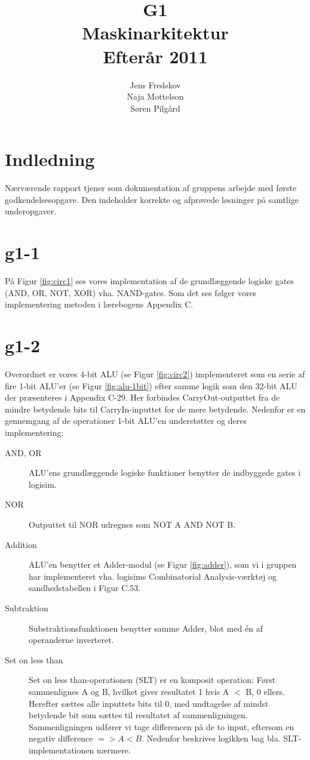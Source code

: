 \documentclass[10pt,a4paper,danish]{article}
\title{G1\\Maskinarkitektur\\Efterår 2011}
\author{Jens Fredskov\\ Naja Mottelson\\Søren Pilgård}
\begin{document}
\maketitle
\newpage

\tableofcontents
\newpage

\section{Indledning}
Nærværende rapport tjener som dokumentation af gruppens arbejde med første
godkendelsesopgave. Den indeholder korrekte og afprøvede løsninger på samtlige
underopgaver. 

\section{g1-1}
På Figur \ref{fig:circ1} ses vores implementation af de grundlæggende logiske
gates (AND, OR, NOT, XOR) vha. NAND-gates. Som det ses følger vores implementering
metoden i lærebogens Appendix C. 

\section{g1-2} 
Overordnet er vores 4-bit ALU (se Figur \ref{fig:circ2}) implementeret som en serie af fire 1-bit ALU'er
(se Figur \ref{fig:alu-1bit}) efter samme logik som den 32-bit ALU der præsenteres i Appendix C-29. Her 
forbindes CarryOut-outputtet fra de mindre betydende bits til CarryIn-inputtet for de mere betydende. 
Nedenfor er en gennemgang af de operationer 1-bit ALU'en understøtter og deres implementering: 

\begin{description}
\item[AND, OR] ALU'ens grundlæggende logiske funktioner benytter de indbyggede gates i logisim.
\item[NOR] Outputtet til NOR udregnes som NOT A AND NOT B. 
\item[Addition] ALU'en benytter et Adder-modul (se Figur \ref{fig:adder}), som vi i gruppen har 
             implementeret vha. logisims Combinatorial Analysis-værktøj og sandhedstabellen i Figur C.53. 
\item[Subtraktion] Substraktionsfunktionen benytter samme Adder, blot med én af operanderne inverteret. 
\item[Set on less than] Set on less than-operationen (SLT) er en komposit operation: Først sammenlignes A og B, 
                     hvilket giver resultatet 1 hvis A $<$ B, 0 ellers. Herefter sættes alle inputtets bits
                     til 0, med undtagelse af mindst betydende bit som sættes til resultatet af 
                     sammenligningen. Sammenligningen udfører vi tage differencen på de to input, eftersom
                     en negativ difference $=> A < B$. Nedenfor beskrives logikken bag bla. SLT-implementationen
                     nærmere. 
\end{description}
\end{document}

